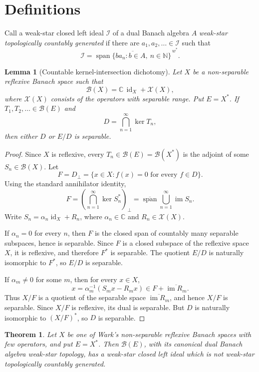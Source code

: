 \documentclass[11pt]{article}
\newtheorem{theorem}{Theorem}
\newtheorem{lemma}{Lemma}
\newcommand{\B}{\mathscr B}
\newcommand{\I}{\mathscr I}
\newcommand{\C}{\mathbb C}
\newcommand{\N}{\mathbb N}
\newcommand{\id}{\operatorname{id}}
\newcommand{\im}{\operatorname{im}}
\begin{document}
\section*{Definitions}

Call a weak-star closed left ideal \(\I\) of a dual Banach algebra \(A\) \emph{weak-star topologically countably generated} if there are \(a_1,a_2,\ldots\in\I\) such that
\[
        \I=\overline{\operatorname{span}\{ba_n:b\in A,\ n\in\N\}}^{\,w^*}.
\]

\begin{lemma}[Countable kernel-intersection dichotomy]
\label{lem:countable-dichotomy}
Let \(X\) be a non-separable reflexive Banach space such that
\[
        \B(X)=\C\,\id_X+\mathscr X(X),
\]
where \(\mathscr X(X)\) consists of the operators with separable range.  Put \(E=X^*\).  If \(T_1,T_2,\ldots\in\B(E)\) and
\[
        D=\bigcap_{n=1}^\infty\ker T_n,
\]
then either \(D\) or \(E/D\) is separable.
\end{lemma}

\begin{proof}
Since \(X\) is reflexive, every \(T_n\in\B(E)=\B(X^*)\) is the adjoint of some \(S_n\in\B(X)\).  Let
\[
        F=D_\perp=\{x\in X: f(x)=0\text{ for every }f\in D\}.
\]
Using the standard annihilator identity,
\[
        F=\left(\bigcap_{n=1}^\infty\ker S_n^*\right)_\perp
          =\overline{\operatorname{span}}\bigcup_{n=1}^\infty \im S_n .
\]
Write \(S_n=\alpha_n\id_X+R_n\), where \(\alpha_n\in\C\) and \(R_n\in\mathscr X(X)\).

If \(\alpha_n=0\) for every \(n\), then \(F\) is the closed span of countably many separable subspaces, hence is separable.  Since \(F\) is a closed subspace of the reflexive space \(X\), it is reflexive, and therefore \(F^*\) is separable.  The quotient \(E/D\) is naturally isomorphic to \(F^*\), so \(E/D\) is separable.

If \(\alpha_m\ne0\) for some \(m\), then for every \(x\in X\),
\[
        x=\alpha_m^{-1}(S_mx-R_mx)\in F+\overline{\im R_m}.
\]
Thus \(X/F\) is a quotient of the separable space \(\overline{\im R_m}\), and hence \(X/F\) is separable.  Since \(X/F\) is reflexive, its dual is separable.  But \(D\) is naturally isomorphic to \((X/F)^*\), so \(D\) is separable.
\end{proof}

\begin{theorem}
\label{thm:not-countably-generated}
Let \(X\) be one of Wark's non-separable reflexive Banach spaces with few operators, and put \(E=X^*\).  Then \(\B(E)\), with its canonical dual Banach algebra weak-star topology, has a weak-star closed left ideal which is not weak-star topologically countably generated.
\end{theorem}
\end{document}

